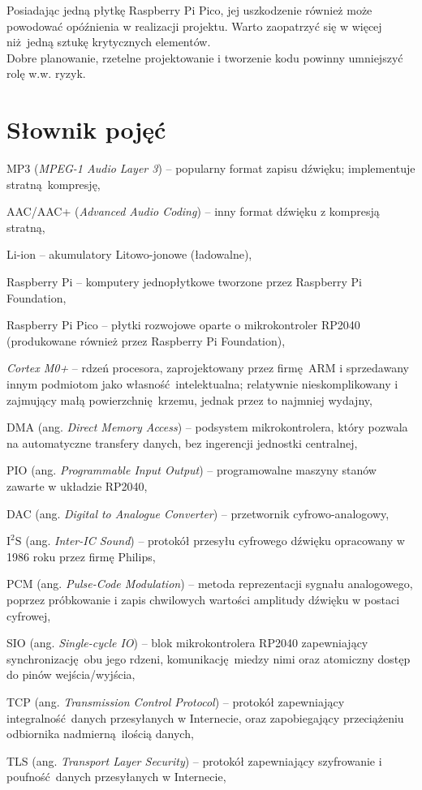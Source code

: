 \documentclass[polish]{aghengthesis}
\let\tempone\itemize
\let\temptwo\enditemize
\renewenvironment{itemize}{\tempone\setlength{\itemsep}{0cm}}{\temptwo}
\newcommand{\isqs}{$\text{I}^{2}\text{S}$}
\begin{document}
		Posiadając jedną płytkę Raspberry Pi Pico, jej uszkodzenie również może powodować opóźnienia w realizacji projektu. Warto zaopatrzyć się w więcej niż jedną sztukę krytycznych elementów.
		$ $\\
		
		Dobre planowanie, rzetelne projektowanie i tworzenie kodu powinny umniejszyć rolę w.w. ryzyk.
	
	\section{Słownik pojęć}
	\begin{itemize}
		\setlength{\itemsep}{0.3cm}
		\item MP3 (\textit{MPEG-1 Audio Layer 3}) -- popularny format zapisu dźwięku; implementuje stratną kompresję,
		\item AAC/AAC+ (\textit{Advanced Audio Coding}) -- inny format dźwięku z kompresją stratną,
		\item Li-ion -- akumulatory Litowo-jonowe (ładowalne),
		\item Raspberry Pi -- komputery jednopłytkowe tworzone przez Raspberry Pi Foundation,
		\item Raspberry Pi Pico -- płytki rozwojowe oparte o mikrokontroler RP2040 (produkowane również przez Raspberry Pi Foundation),
		\item \textit{Cortex M0+} -- rdzeń procesora, zaprojektowany przez firmę ARM i sprzedawany innym podmiotom jako własność intelektualna; relatywnie nieskomplikowany i zajmujący małą powierzchnię krzemu, jednak przez to najmniej wydajny,
		\item DMA (ang. \textit{Direct Memory Access}) -- podsystem mikrokontrolera, który pozwala na automatyczne transfery danych, bez ingerencji jednostki centralnej,
		\item PIO (ang. \textit{Programmable Input Output}) -- programowalne maszyny stanów zawarte w układzie RP2040,
		\item DAC (ang. \textit{Digital to Analogue Converter}) -- przetwornik cyfrowo-analogowy,
		\item \isqs{} (ang. \textit{Inter-IC Sound}) -- protokół przesyłu cyfrowego dźwięku opracowany w 1986 roku przez firmę Philips,
		\item PCM (ang. \textit{Pulse-Code Modulation}) -- metoda reprezentacji sygnału analogowego, poprzez próbkowanie i zapis chwilowych wartości amplitudy dźwięku w postaci cyfrowej,
		\item SIO (ang. \textit{Single-cycle IO}) -- blok mikrokontrolera RP2040 zapewniający synchronizację obu jego rdzeni, komunikację miedzy nimi oraz atomiczny dostęp do pinów wejścia/wyjścia,
		\item TCP (ang. \textit{Transmission Control Protocol}) -- protokół zapewniający integralność danych przesyłanych w Internecie, oraz zapobiegający przeciążeniu odbiornika nadmierną ilością danych,
		\item TLS (ang. \textit{Transport Layer Security}) -- protokół zapewniający szyfrowanie i poufność danych przesyłanych w Internecie,
	\end{itemize}
\end{document}
